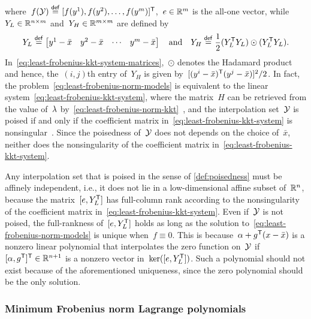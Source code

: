 where~$\obj(\xpt) \eqdef [\obj(y^1), \obj(y^2), \dots, \obj(y^m)]^{\T}$,~$e \in \mathbb{R}^m$ is the all-one vector, while~$Y_L \in \mathbb{R}^{n \times m}$ and~$Y_H \in \mathbb{R}^{m \times m}$ are defined by
\begin{equation}
    \label{eq:least-frobenius-kkt-system-matrices}
    Y_L \mathrel{\stackrel{\mathsf{def}}{=}} 
    \begin{bmatrix}
        y^1 - \bar{x}   & y^2 - \bar{x} & \cdots    & y^m - \bar{x}
    \end{bmatrix} \quad \text{and} \quad Y_H \mathrel{\stackrel{\mathsf{def}}{=}} \frac{1}{2} (Y_L^{\mathsf{T}} Y_L) \odot (Y_L^{\mathsf{T}} Y_L).
\end{equation}
%
In~\cref{eq:least-frobenius-kkt-system-matrices},~$\odot$ denotes the Hadamard product and hence, the~$(i, j)$th entry of~$Y_H$ is given by~$[(y^i - \bar{x})^{\mathsf{T}} (y^j - \bar{x})]^2 / 2$.
In fact, the problem~\cref{eq:least-frobenius-norm-models} is equivalent to the linear system~\cref{eq:least-frobenius-kkt-system}, where the matrix~$H$ can be retrieved from the value of~$\lm$ by~\cref{eq:least-frobenius-norm-kkt}~\cite[\S~2]{Powell_2004b}, and the interpolation set~$\xpt$ is poised if and only if the coefficient matrix in~\cref{eq:least-frobenius-kkt-system} is nonsingular~\cite[\S~5.3]{Conn_Scheinberg_Vicente_2009b}.
Since the poisedness of~$\xpt$ does not depends on the choice of~$\bar{x}$, neither does the nonsingularity of the coefficient matrix in~\cref{eq:least-frobenius-kkt-system}.

Any interpolation set that is poised in the sense of \cref{def:poisedness} must be affinely independent, i.e., it does not lie in a low-dimensional affine subset of~$\mathbb{R}^n$, because the matrix~$[e, Y_L^{\mathsf{T}}]$ has full-column rank according to the nonsingularity of the coefficient matrix in~\cref{eq:least-frobenius-kkt-system}.
Even if~$\xpt$ is not poised, the full-rankness of~$[e, Y_L^{\mathsf{T}}]$ holds as long as the solution to~\cref{eq:least-frobenius-norm-models} is unique when~$f \equiv 0$.
This is because~$\alpha + g^{\T} (\iter - \bar{x})$ is a nonzero linear polynomial that interpolates the zero function on~$\xpt$ if~$[\alpha, g^{\mathsf{T}}]^{\mathsf{T}} \in \mathbb{R}^{n + 1}$ is a nonzero vector in~$\ker([e, Y_L^{\mathsf{T}}])$.
Such a polynomial should not exist because of the aforementioned uniqueness, since the zero polynomial should be the only solution.

\subsubsection{Minimum Frobenius norm Lagrange polynomials}

